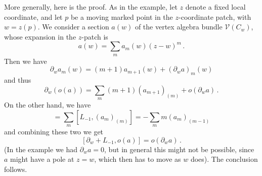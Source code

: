 \documentclass[12pt,letterpaper,reqno]{amsart}
\numberwithin{equation}{section}
\newcommand{\bbZ}{\ensuremath{\mathbb Z}}
\newcommand{\de}{\mathrm{d}}
\newcommand{\vertex}{\mathcal{V}}
\begin{document}
More generally, here is the proof.
As in the example,
let $z$ denote a fixed local coordinate, and let $p$ 
be a moving marked point in the $z$-coordinate patch, with
$w = z(p)$.
We consider a section $a(w)$ of the vertex algebra bundle $\vertex(C_w)$, whose expansion in the 
$z$-patch is
\begin{equation}
  a(w) = \sum_m a_m(w) (z-w)^m \, .
\end{equation}
Then we have
\begin{equation}
  \partial_w a_m(w) = (m+1) a_{m+1}(w) + (\partial_w a)_m(w)
\end{equation}
and thus
\begin{equation}
  \partial_w (o(a)) = \sum_{m} (m+1) (a_{m+1})_{(m)} + o(\partial_w a) \, .
\end{equation}
On the other hand, we have
\begin{equation}
  [L_{-1}, o(a)] = \sum_{m} [L_{-1}, (a_m)_{(m)}] = -\sum_m m (a_m)_{(m-1)} 
\end{equation}
and combining these two we get
\begin{equation} \label{eq:deriv-check-tricky}
  [\partial_w + L_{-1}, o(a)] = o(\partial_w a) \, .
\end{equation}
(In the example we had $\partial_w a = 0$, but in general
this might not be possible, since $a$ might have a pole at $z=w$,
which then has to move as $w$ does).
The conclusion follows.
\end{document}
